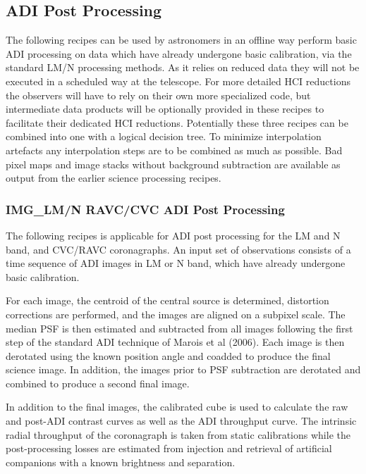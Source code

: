 
\subsection{ADI Post Processing}
\label{ssec:ADI_postprocessing}



The following recipes can be used by astronomers in an offline way
perform basic ADI processing on data which have already undergone
basic calibration, via the standard LM/N processing methods.  As it
relies on reduced data they will not be executed in a scheduled way at
the telescope. For more detailed HCI reductions the observers will
have to rely on their own more specialized code, but intermediate data
products will be optionally provided in these recipes to facilitate
their dedicated HCI reductions. Potentially these three recipes can be combined into one with a logical decision tree. To minimize interpolation artefacts any interpolation steps are to be combined as much as possible. Bad pixel maps and image stacks without background subtraction are available as output from the earlier science processing recipes.

\subsubsection{IMG\_LM/N RAVC/CVC ADI Post Processing}
\label{sssec:adi_img_vc}


The following recipes is applicable for ADI post processing for the LM
and N band, and CVC/RAVC coronagraphs. An input set of
observations consists of a time sequence of ADI images in LM or N
band, which have already undergone basic calibration. 

For each image, the centroid of the central source is determined,
distortion corrections are performed, and the images are aligned on a
subpixel scale. The median PSF is then estimated and subtracted from
all images following the first step of the standard ADI technique of
Marois et al (2006).  Each image is then derotated using the known
position angle and coadded to produce the final science image. In
addition, the images prior to PSF subtraction are derotated and
combined to produce a second final image.

In addition to the final images, the calibrated cube is used to calculate the raw and post-ADI contrast curves as
well as the ADI throughput curve. The intrinsic radial throughput of
the coronagraph is taken from static calibrations while the
post-processing losses are estimated from injection and retrieval of
artificial companions with a known brightness and separation.

